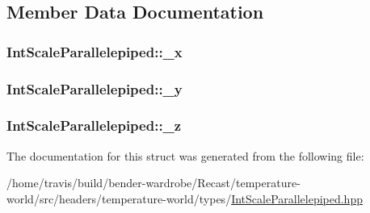 \subsection{Member Data Documentation}
\hypertarget{struct_int_scale_parallelepiped_a81ba3ef17d50475ba400ecae4f45a528}{
\subsubsection[{\-\_\-x}]{ Int\-Scale\-Parallelepiped\-::\-\_\-x\hspace{0.3cm}{\ttfamily [protected]}}}\label{struct_int_scale_parallelepiped_a81ba3ef17d50475ba400ecae4f45a528}
\hypertarget{struct_int_scale_parallelepiped_a42cea4ad40c67c30fc3647b4260c8a44}{
\subsubsection[{\-\_\-y}]{ Int\-Scale\-Parallelepiped\-::\-\_\-y\hspace{0.3cm}{\ttfamily [protected]}}}\label{struct_int_scale_parallelepiped_a42cea4ad40c67c30fc3647b4260c8a44}
\hypertarget{struct_int_scale_parallelepiped_a613558e63f3ecc557cc086d8ddb17d30}{
\subsubsection[{\-\_\-z}]{ Int\-Scale\-Parallelepiped\-::\-\_\-z\hspace{0.3cm}{\ttfamily [protected]}}}\label{struct_int_scale_parallelepiped_a613558e63f3ecc557cc086d8ddb17d30}


The documentation for this struct was generated from the following file\-:\begin{DoxyCompactItemize}
\item 
/home/travis/build/bender-\/wardrobe/\-Recast/temperature-\/world/src/headers/temperature-\/world/types/\hyperlink{_int_scale_parallelepiped_8hpp}{Int\-Scale\-Parallelepiped.\-hpp}\end{DoxyCompactItemize}
